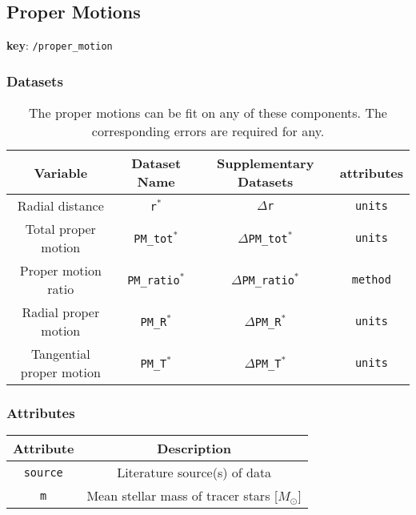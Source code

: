 \subsection{Proper Motions}

\textbf{key}: \texttt{/proper\_motion}

\subsubsection{Datasets}

\begin{center}
\begin{table}[H]
\begin{tabular}{ | c | c | c | c | }
    \hline
    Variable & Dataset Name & Supplementary Datasets &  attributes \\
    \hline\hline
    Radial distance & \texttt{r\(^*\)} & \texttt{\(\Delta\)r} & \texttt{units} \\
    \hline
    Total proper motion & \texttt{PM\_tot\(^*\)} &
    \texttt{\(\Delta\)PM\_tot\(^*\)} & \texttt{units}\\
    \hline
    Proper motion ratio & \texttt{PM\_ratio\(^*\)} &
    \texttt{\(\Delta\)PM\_ratio\(^*\)} & \texttt{method} \\
    \hline
    Radial proper motion & \texttt{PM\_R\(^*\)} &
    \texttt{\(\Delta\)PM\_R\(^*\)} & \texttt{units}\\
    \hline
    Tangential proper motion & \texttt{PM\_T\(^*\)} &
    \texttt{\(\Delta\)PM\_T\(^*\)} & \texttt{units}\\
    \hline
\end{tabular}
\caption*{
    The proper motions can be fit on any of these components.
    The corresponding errors are required for any.
}
\end{table}
\end{center}

\subsubsection{Attributes}


\begin{center}
\begin{table}[H]
\begin{tabular}{ | c | c | }
    \hline
    Attribute & Description \\
    \hline\hline
    \texttt{source} & Literature source(s) of data \\
    \hline
    \texttt{m} & Mean stellar mass of tracer stars [\(M_\odot\)] \\
    \hline
\end{tabular}
\end{table}
\end{center}
